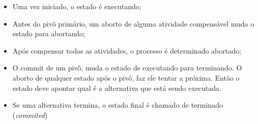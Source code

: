 \documentclass[a4paper,12pt,notitlepage]{article}
\begin{document}
\begin{itemize}
  \item Uma vez iniciado, o estado é executando;
  \item Antes do pivô primário, um aborto de alguma atividade compensável muda o estado para abortando;
  \item Após compensar todas as atividades, o processo é determinado abortado;
  \item O commit de um pivô, muda o estado de executando para terminando. O aborto de qualquer estado após o pivô, faz ele tentar a próxima. Então o estado deve apontar qual é a alternativa que está sendo executada.
  \item Se uma alternativa termina, o estado final é chamado de terminado (\textit{commited})
\end{itemize}



 
\end{document}

